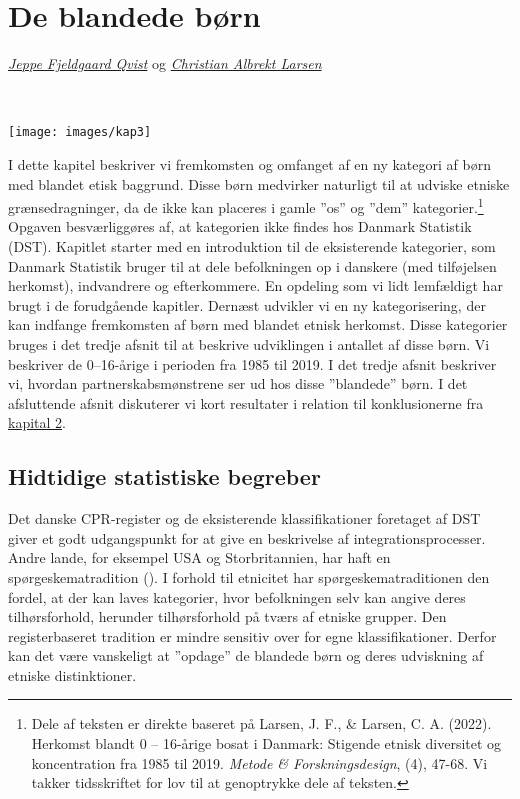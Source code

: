 \documentclass[
]{book}
\begin{document}
\newpage
\thispagestyle{empty}

\chapter{De blandede børn}\label{kap3}

\thispagestyle{empty}

\emph{\href{https://vbn.aau.dk/da/persons/jeppefl}{Jeppe Fjeldgaard Qvist}} og \emph{\href{https://vbn.aau.dk/en/persons/albrekt}{Christian Albrekt Larsen}}

~~~~

\texttt{[image: images/kap3]}

\newpage

I dette kapitel beskriver vi fremkomsten og omfanget af en ny kategori af børn med blandet etisk baggrund. Disse børn medvirker naturligt til at udviske etniske grænsedragninger, da de ikke kan placeres i gamle ''os'' og ''dem'' kategorier.\footnote{Dele af teksten er direkte baseret på Larsen, J. F., \& Larsen, C. A. (2022). Herkomst blandt 0 -- 16-årige bosat i Danmark: Stigende etnisk diversitet og koncentration fra 1985 til 2019. \emph{Metode \& Forskningsdesign}, (4), 47-68. Vi takker tidsskriftet for lov til at genoptrykke dele af teksten.} Opgaven besværliggøres af, at kategorien ikke findes hos Danmark Statistik (DST). Kapitlet starter med en introduktion til de eksisterende kategorier, som Danmark Statistik bruger til at dele befolkningen op i danskere (med tilføjelsen herkomst), indvandrere og efterkommere. En opdeling som vi lidt lemfældigt har brugt i de forudgående kapitler. Dernæst udvikler vi en ny kategorisering, der kan indfange fremkomsten af børn med blandet etnisk herkomst. Disse kategorier bruges i det tredje afsnit til at beskrive udviklingen i antallet af disse børn. Vi beskriver de 0--16-årige i perioden fra 1985 til 2019. I det tredje afsnit beskriver vi, hvordan partnerskabsmønstrene ser ud hos disse ''blandede'' børn. I det afsluttende afsnit diskuterer vi kort resultater i relation til konklusionerne fra \hyperref[kap2]{kapital 2}.

\section{Hidtidige statistiske begreber}\label{hidtidige-statistiske-begreber}

Det danske CPR-register og de eksisterende klassifikationer foretaget af DST giver et godt udgangspunkt for at give en beskrivelse af integrationsprocesser. Andre lande, for eksempel USA og Storbritannien, har haft en spørgeskematradition (). I forhold til etnicitet har spørgeskematraditionen den fordel, at der kan laves kategorier, hvor befolkningen selv kan angive deres tilhørsforhold, herunder tilhørsforhold på tværs af etniske grupper. Den registerbaseret tradition er mindre sensitiv over for egne klassifikationer. Derfor kan det være vanskeligt at ''opdage'' de blandede børn og deres udviskning af etniske distinktioner.
\end{document}
